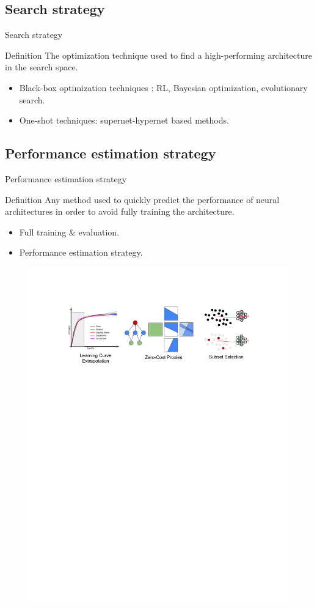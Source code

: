 \documentclass[aspectratio=169,xcolor=dvipsnames]{beamer}
\begin{document}
\subsection{Search strategy}
\begin{frame}{Search strategy}
    \begin{block}{Definition}
        The optimization technique used to find a high-performing architecture in the search space.
    \end{block}
    \begin{itemize}
        \item Black-box optimization techniques : RL, Bayesian optimization, evolutionary search.
        \item One-shot techniques: supernet-hypernet based methods.
    \end{itemize}
\end{frame}

\subsection{Performance estimation strategy}
\begin{frame}{Performance estimation strategy}
    \begin{block}{Definition}
        Any method used to quickly predict the performance of neural architectures in order to avoid fully training the architecture.
    \end{block}
    \begin{itemize}
        \item Full training \& evaluation.
        \item Performance estimation strategy.
    \end{itemize}
    \begin{figure}[htbp]
        \centering
        \includegraphics[width=.7\linewidth]{perf_estim_strat.pdf}
    \end{figure}
\end{frame}
\end{document}
